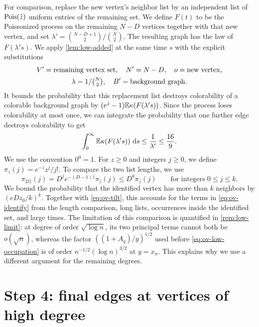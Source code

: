 For comparison, replace the new vertex's neighbor list by an independent list of $\operatorname{Pois}(\hat z)$ uniform entries of the remaining set. We define $F(t)$ to be the Poissonized process on the remaining $N - D$ vertices together with that new vertex, and set $\lambda' = \binom{N - D + 1}{2}/\binom N2$. The resulting graph has the law of $F(\lambda's)$. We apply \cref{lem:low-added} at the same time $s$ with the explicit substitutions
\[
\begin{gathered}
V' = \text{remaining vertex set}, \quad N' = N - D, \quad o = \text{new vertex}, \\
\lambda = 1/\tbinom N2, \quad B' = \text{background graph}.
\end{gathered}
\]
It bounds the probability that this replacement list destroys colorability of a colorable background graph by $(e^{\hat z} - 1)\mathbb E\kappa(F(\lambda's))$. Since the process loses colorability at most once, we can integrate the probability that one further edge destroys colorability to get
\[
\int_0^\infty\mathbb E\kappa(F(\lambda's))\,\,\mathrm d s \le \frac1{\lambda'} \le \frac{16}{9}.
\]
We use the convention $0^0 = 1$. For $z \ge 0$ and integers $j \ge 0$, we define $\pi_z(j) = e^{-z}z^j/j!$. To compare the two list lengths, we use
\begin{equation}\label{eq:ov-tilt}
\pi_{D\hat z}(j) = D^j e^{-(D - 1)\hat z}\pi_{\hat z}(j) \le D^k\pi_{\hat z}(j)\qquad\text{for integers }0 \le j \le k.
\end{equation}
We bound the probability that the identified vertex has more than $k$ neighbors by $(eDz_0/k)^k$. Together with \eqref{eq:ov-tilt}, this accounts for the terms in \eqref{eq:ov-identify} from the length comparison, long lists, occurrences inside the identified set, and large times. The limitation of this comparison is quantified in \cref{rem:low-limit}: at degree of order $\sqrt{\log n}$, its two principal terms cannot both be $o(\sqrt n)$, whereas the factor $((1 + A_q)/y)^{1/2}$ used before \eqref{eq:ov-low-occupation} is of order $n^{-1/2}(\log n)^{3/2}$ at $y = x_n$. This explains why we use a different argument for the remaining degrees.

\section{Step 4: final edges at vertices of high degree}\label{sec:ov-high}

